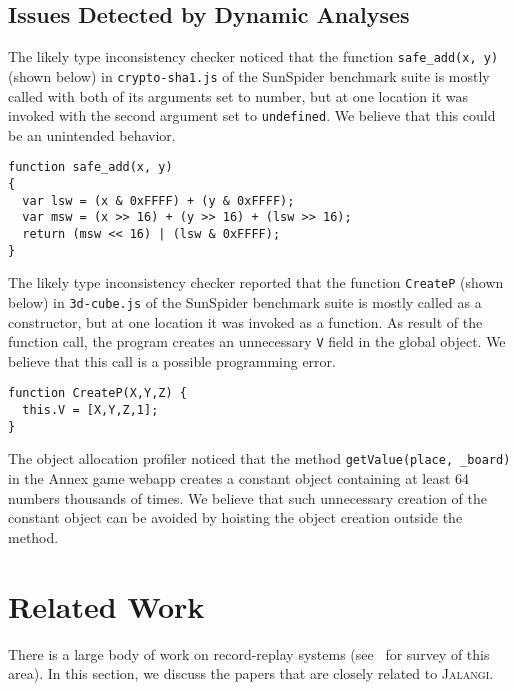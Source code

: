 \documentclass{sig-alternate}
\def\jalangi{\textsc{Jalangi}}
\begin{document}
\subsection{Issues Detected by Dynamic Analyses}
\label{sec:issu-detect-dynam}

The likely type inconsistency checker noticed that the function
\texttt{safe\_add(x, y)} (shown below) in \texttt{crypto-sha1.js} of the SunSpider
benchmark suite is mostly called with both of its arguments set to number,
but at one location it was invoked with the second argument set to
\texttt{undefined}.   We believe that this could be an unintended
behavior.   

{\scriptsize
\begin{lstlisting}[mathescape]
function safe_add(x, y)
{
  var lsw = (x & 0xFFFF) + (y & 0xFFFF);
  var msw = (x >> 16) + (y >> 16) + (lsw >> 16);
  return (msw << 16) | (lsw & 0xFFFF);
}
\end{lstlisting}
}

The likely type inconsistency checker reported that the function
\texttt{CreateP} (shown below) in \texttt{3d-cube.js} of the SunSpider
benchmark suite is mostly called as a constructor, but at one location
it was invoked as a function.  As result of the function call, the
program creates an unnecessary \texttt{V} field in the global object.
We believe that this call is a possible programming error.

{\scriptsize
\begin{lstlisting}[mathescape]
function CreateP(X,Y,Z) {
  this.V = [X,Y,Z,1];
}
\end{lstlisting}
}
 
The object allocation profiler noticed that the method
\texttt{getValue(place, \_board)} in the Annex game webapp creates a
constant object containing at least 64 numbers thousands of times.  We
believe that such unnecessary creation of the constant object can be
avoided by hoisting the object creation outside the method.

\section{Related Work}
\label{sec:related-work}

There is a large body of work on record-replay systems
(see~\cite{Cornelis03ataxonomy,Dionne96ataxonomy} for survey of this
area).  In this section, we discuss the papers that are closely
related to \jalangi{}.
\end{document}
